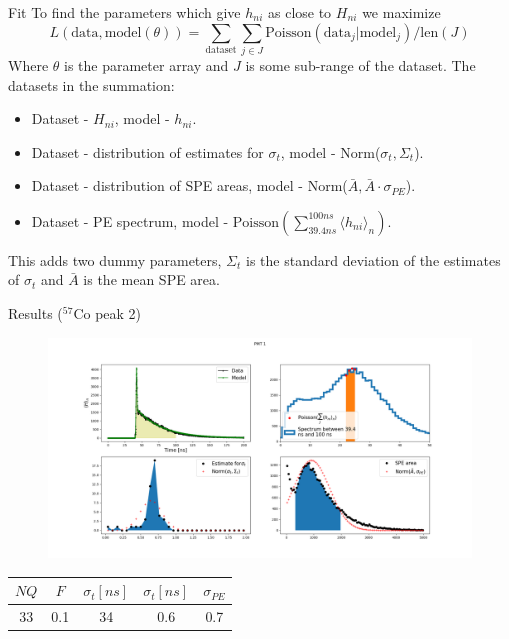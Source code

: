 \documentclass{beamer}
\begin{document}
\begin{frame}{Fit}
To find the parameters which give $h_{ni}$ as close to $H_{ni}$ we maximize 
\begin{equation}
L(\text{data},\text{model}(\theta))=\sum_{\text{dataset}}\sum_{j\in J}\text{Poisson}(\text{data}_j|\text{model}_j)/\text{len}(J)
\end{equation}
Where $\theta$ is the parameter array and $J$ is some sub-range of the dataset. The datasets in the summation:
\begin{itemize}
\item Dataset - $H_{ni}$, model - $h_{ni}$.
\item Dataset - distribution of estimates for $\sigma_t$, model - Norm($\sigma_t, \Sigma_t$).
\item Dataset - distribution of SPE areas, model - Norm($\bar{A}, \bar{A}\cdot\sigma_{PE}$).
\item Dataset - PE spectrum, model - $\text{Poisson}(\sum_{39.4 ns}^{100 ns}\langle h_{ni}\rangle_n)$.
\end{itemize}
This adds two dummy parameters, $\Sigma_t$ is the standard deviation of the estimates of $\sigma_t$ and $\bar{A}$ is the mean SPE area. 
\end{frame}

\begin{frame}{Results ($^{57}$Co peak 2)}
\begin{figure}[h]
\includegraphics[width=1\linewidth]{Co2.png}
\end{figure}

\begin{center}
\begin{tabular}{ |c| c| c| c| c|}
\hline
 $NQ$ & $F$ & $\sigma_t [ns]$ & $\sigma_t [ns]$ & $\sigma_{PE}$\\ 
\hline
33 & 0.1 & 34 & 0.6 & 0.7\\  
\hline   
\end{tabular}
\end{center}
\end{frame}
\end{document}
